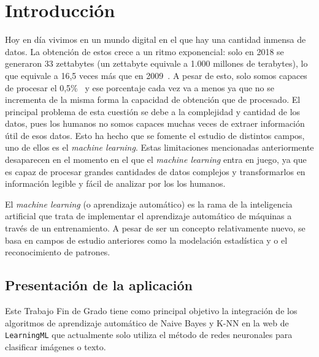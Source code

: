 \documentclass[a4paper, 12pt]{book}
\begin{document}

\cleardoublepage
\chapter{Introducción}
\label{sec:intro} %

Hoy en día vivimos en un mundo digital en el que hay una cantidad inmensa de datos. La obtención de estos crece a un ritmo exponencial: solo en 2018 se generaron 33 zettabytes (un zettabyte equivale a 1.000 millones de terabytes), lo que equivale a 16,5 veces más que en 2009~\cite{webstatista}. A pesar de esto, solo somos capaces de procesar el 0,5\%~\cite{machinelearning} y ese porcentaje cada vez va a menos ya que no se incrementa de la misma forma la capacidad de obtención que de procesado. El principal problema de esta cuestión se debe a la complejidad y cantidad de los datos, pues los humanos no somos capaces muchas veces de extraer información útil de esos datos. Esto ha hecho que se fomente el estudio de distintos campos, uno de ellos es el \emph{machine learning}. Estas limitaciones mencionadas anteriormente desaparecen en el momento en el que el \emph{machine learning} entra en juego, ya que es capaz de procesar grandes cantidades de datos complejos y transformarlos en información legible y fácil de analizar por los los humanos.

El \emph{machine learning} (o aprendizaje automático) es la rama de la inteligencia artificial que trata de implementar el aprendizaje automático de máquinas a través de un entrenamiento. A pesar de ser un concepto relativamente nuevo, se basa en campos de estudio anteriores como la modelación estadística y o el reconocimiento de patrones.

\section{Presentación de la aplicación}
\label{sec:presentacionaplicacion}

Este Trabajo Fin de Grado tiene como principal objetivo la integración de los algoritmos de aprendizaje automático de Naive Bayes y K-NN en la web de \texttt{LearningML} que actualmente solo utiliza el método de redes neuronales para clasificar imágenes o texto.
\end{document}
